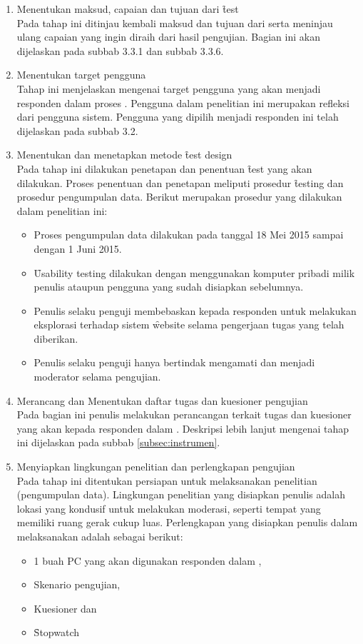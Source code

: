 \begin{enumerate}
	\item Menentukan maksud, capaian dan tujuan dari \f{test}\\
	Pada tahap ini ditinjau kembali maksud dan tujuan dari \ust \space serta meninjau ulang capaian yang ingin diraih dari hasil pengujian. Bagian ini akan dijelaskan pada subbab 3.3.1 dan subbab 3.3.6.
	\item Menentukan target pengguna\\
	Tahap ini menjelaskan mengenai target pengguna yang akan menjadi responden dalam proses \ust. Pengguna dalam penelitian ini merupakan refleksi dari pengguna sistem. Pengguna yang dipilih menjadi responden \ust \space ini telah dijelaskan pada subbab 3.2.
	\item Menentukan dan menetapkan metode \f{test design}\\
	Pada tahap ini dilakukan penetapan dan penentuan \f{test} yang akan dilakukan. Proses penentuan dan penetapan meliputi prosedur \f{testing} dan prosedur pengumpulan data. Berikut merupakan prosedur yang dilakukan dalam penelitian ini:
	\begin{itemize}
		\item Proses pengumpulan data dilakukan pada tanggal 18 Mei 2015 sampai dengan 1 Juni 2015.
		\item \f{Usability testing} dilakukan dengan menggunakan komputer pribadi milik penulis ataupun pengguna yang sudah disiapkan sebelumnya. 
		\item Penulis selaku penguji membebaskan kepada responden untuk melakukan eksplorasi terhadap sistem \f{website} selama pengerjaan tugas yang telah diberikan.
		\item Penulis selaku penguji hanya bertindak mengamati dan menjadi moderator selama pengujian.
	\end{itemize} 
	\item Merancang dan Menentukan daftar tugas dan kuesioner pengujian\\
	Pada bagian ini penulis melakukan perancangan terkait tugas dan kuesioner yang akan kepada responden dalam \ust. Deskripsi lebih lanjut mengenai tahap ini dijelaskan pada subbab \ref{subsec:instrumen}.
	\item Menyiapkan lingkungan penelitian dan perlengkapan pengujian\\
	Pada tahap ini ditentukan persiapan untuk melaksanakan penelitian (pengumpulan data). Lingkungan penelitian yang disiapkan penulis adalah lokasi yang kondusif untuk melakukan moderasi, seperti tempat yang memiliki ruang gerak cukup luas. Perlengkapan yang disiapkan penulis dalam melaksanakan \ust \space adalah sebagai berikut:
	\begin{itemize}
		\item 1 buah PC yang akan digunakan responden dalam \ust,
		\item Skenario pengujian,
		\item Kuesioner dan
		\item \f{Stopwatch}
	\end{itemize}
\end{enumerate}

